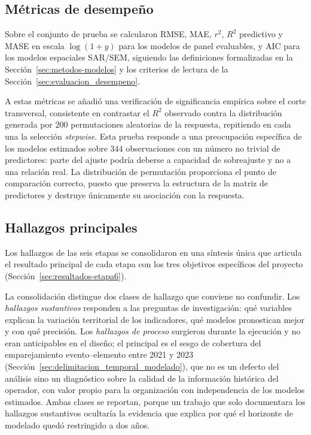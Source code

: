 \subsection{Métricas de desempeño}
\label{sec:metricas_desempeno}
Sobre el conjunto de prueba se calcularon RMSE, MAE, $r^2$, $R^2$ predictivo y MASE en escala $\log(1+y)$ para los modelos de panel evaluables, y AIC para los modelos espaciales SAR/SEM, siguiendo las definiciones formalizadas en la Sección~\ref{sec:metodos-modelos} y los criterios de lectura de la Sección~\ref{sec:evaluacion_desempeno}.

A estas métricas se añadió una verificación de significancia empírica sobre el corte transversal, consistente en contrastar el $R^2$ observado contra la distribución generada por $200$ permutaciones aleatorias de la respuesta, repitiendo en cada una la selección \emph{stepwise}. Esta prueba responde a una preocupación específica de los modelos estimados sobre $344$ observaciones con un número no trivial de predictores: parte del ajuste podría deberse a capacidad de sobreajuste y no a una relación real. La distribución de permutación proporciona el punto de comparación correcto, puesto que preserva la estructura de la matriz de predictores y destruye únicamente su asociación con la respuesta.

\subsection{Hallazgos principales}
\label{sec:hallazgos_principales}
Los hallazgos de las seis etapas se consolidaron en una síntesis única que articula el resultado principal de cada etapa con los tres objetivos específicos del proyecto (Sección~\ref{sec:resultados-etapa6}).

La consolidación distingue dos clases de hallazgo que conviene no confundir. Los \textit{hallazgos sustantivos} responden a las preguntas de investigación: qué variables explican la variación territorial de los indicadores, qué modelos pronostican mejor y con qué precisión. Los \textit{hallazgos de proceso} surgieron durante la ejecución y no eran anticipables en el diseño; el principal es el sesgo de cobertura del emparejamiento evento--elemento entre 2021 y 2023 (Sección~\ref{sec:delimitacion_temporal_modelado}), que no es un defecto del análisis sino un diagnóstico sobre la calidad de la información histórica del operador, con valor propio para la organización con independencia de los modelos estimados. Ambas clases se reportan, porque un trabajo que solo documentara los hallazgos sustantivos ocultaría la evidencia que explica por qué el horizonte de modelado quedó restringido a dos años.

